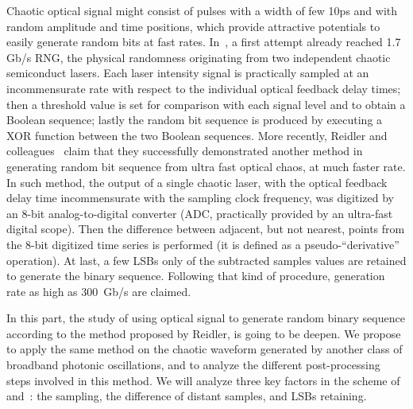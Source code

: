 Chaotic optical signal might consist of pulses with a width of few 10ps and with random amplitude and time positions, which provide attractive potentials to easily generate random bits at fast rates. In~\cite{fast}, a first attempt already reached 1.7 Gb/s RNG, the physical randomness originating from two independent chaotic semiconduct lasers. Each laser intensity signal is practically sampled at an incommensurate rate with respect to the individual optical feedback delay times; then a threshold value is set for comparison with each signal level and to obtain a Boolean sequence; lastly the random bit sequence is produced by executing a XOR function between the two Boolean sequences.  More recently, Reidler and colleagues~\cite{ultrafast2009,ultrafast2010} claim that they successfully demonstrated another method in generating random bit sequence from ultra fast optical chaos, at much faster rate.  In such method, the output of a single chaotic laser, with the optical feedback delay time incommensurate with 
the sampling clock frequency, was digitized by an 8-bit analog-to-digital converter (ADC, practically provided by an ultra-fast digital scope).  Then the difference between adjacent, but not nearest, points from the 8-bit digitized time series is performed (it is defined as a pseudo-``derivative'' operation). At last, a few LSBs only of the subtracted samples values are retained to generate the binary sequence. Following that kind of procedure, generation rate as high as 300~Gb/s are claimed.

In this part, the study of using optical signal to generate random binary sequence according to the method proposed by Reidler, is going to be deepen. We propose to apply the same method on the chaotic waveform generated by another class of broadband photonic oscillations, and to analyze the different post-processing steps involved in this method. We will analyze three key factors in the scheme of~\cite{ultrafast2009} and~\cite{ultrafast2010}: the sampling, the difference of distant samples, and LSBs retaining.  





























